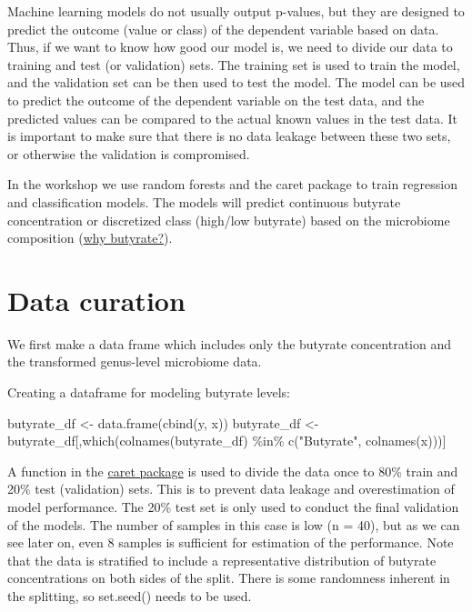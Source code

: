 \documentclass[
  oneside]{book}
\newenvironment{Shaded}{\begin{snugshade}}{\end{snugshade}}
\newcommand{\FunctionTok}[1]{\textcolor[rgb]{0.00,0.00,0.00}{#1}}
\newcommand{\NormalTok}[1]{#1}
\newcommand{\OtherTok}[1]{\textcolor[rgb]{0.56,0.35,0.01}{#1}}
\newcommand{\SpecialCharTok}[1]{\textcolor[rgb]{0.00,0.00,0.00}{#1}}
\newcommand{\StringTok}[1]{\textcolor[rgb]{0.31,0.60,0.02}{#1}}
\begin{document}
Machine learning models do not usually output p-values, but they are designed to
predict the outcome (value or class) of the dependent variable based on data.
Thus, if we want to know how good our model is, we need to divide our data to training
and test (or validation) sets. The training set is used to train the model, and the
validation set can be then used to test the model. The model can be used to predict
the outcome of the dependent variable on the test data, and the predicted values can
be compared to the actual known values in the test data. It is important to make sure
that there is no data leakage between these two sets, or otherwise the validation is
compromised.

In the workshop we use random forests and the caret package to train regression and
classification models. The models will predict continuous butyrate concentration or discretized
class (high/low butyrate) based on the microbiome composition (\href{https://scholar.google.com/scholar?as_sdt=0\%2C5\&as_ylo=2015\&q=butyrate+and+gut+microbiome\&btnG=}{why butyrate?}).

\hypertarget{data-curation}{%
\section{Data curation}\label{data-curation}}

We first make a data frame which includes only the butyrate concentration and the
transformed genus-level microbiome data.

Creating a dataframe for modeling butyrate levels:

\begin{Shaded}
\begin{Highlighting}[]
\NormalTok{butyrate\_df }\OtherTok{\textless{}{-}} \FunctionTok{data.frame}\NormalTok{(}\FunctionTok{cbind}\NormalTok{(y, x))}
\NormalTok{butyrate\_df }\OtherTok{\textless{}{-}}\NormalTok{ butyrate\_df[,}\FunctionTok{which}\NormalTok{(}\FunctionTok{colnames}\NormalTok{(butyrate\_df) }\SpecialCharTok{\%in\%} \FunctionTok{c}\NormalTok{(}\StringTok{"Butyrate"}\NormalTok{, }\FunctionTok{colnames}\NormalTok{(x)))]}
\end{Highlighting}
\end{Shaded}

A function in the \href{https://topepo.github.io/caret/}{caret package} is used to divide the data once to 80\% train and 20\% test (validation)
sets. This is to prevent data leakage and overestimation of model performance. The
20\% test set is only used to conduct the final validation of the models. The number of
samples in this case is low (n = 40), but as we can see later on, even 8 samples is
sufficient for estimation of the performance. Note that the data is stratified to include
a representative distribution of butyrate concentrations on both sides of the split.
There is some randomness inherent in the splitting, so set.seed() needs to be used.
\end{document}
